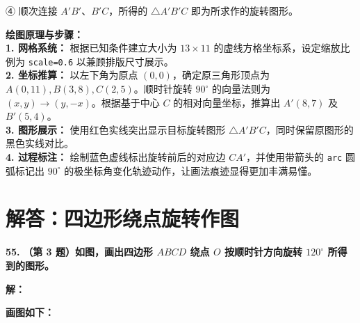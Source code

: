 ④ 顺次连接 $A'B'$、$B'C$，所得的 $\triangle A'B'C$ 即为所求作的旋转图形。

\vspace{0.4cm}
{\small\color{blue!70!black}
\textbf{绘图原理与步骤：}\\
\textbf{1. 网格系统：} 根据已知条件建立大小为 $13 \times 11$ 的虚线方格坐标系，设定缩放比例为 \texttt{scale=0.6} 以兼顾排版尺寸展示。\\
\textbf{2. 坐标推算：} 以左下角为原点 $(0,0)$，确定原三角形顶点为 $A(0,11), B(3,8), C(2,5)$。顺时针旋转 $90^\circ$ 的向量法则为 $(x, y) \to (y, -x)$。根据基于中心 $C$ 的相对向量坐标，推算出 $A'(8, 7)$ 及 $B'(5, 4)$。\\
\textbf{3. 图形展示：} 使用红色实线突出显示目标旋转图形 $\triangle A'B'C$，同时保留原图形的黑色实线对比。\\
\textbf{4. 过程标注：} 绘制蓝色虚线标出旋转前后的对应边 $CA'$，并使用带箭头的 \texttt{arc} 圆弧标记出 $90^\circ$ 的极坐标角变化轨迹动作，让画法痕迹显得更加丰满易懂。
}

\newpage



\section{解答：四边形绕点旋转作图}

\vspace{0.6cm}

\textbf{\LARGE 55.} \textbf{（第 3 题）如图，画出四边形 $ABCD$ 绕点 $O$ 按顺时针方向旋转 $120^\circ$ 所得到的图形。}

\vspace{0.4cm}
\textbf{解：}

\textbf{画图如下：}

